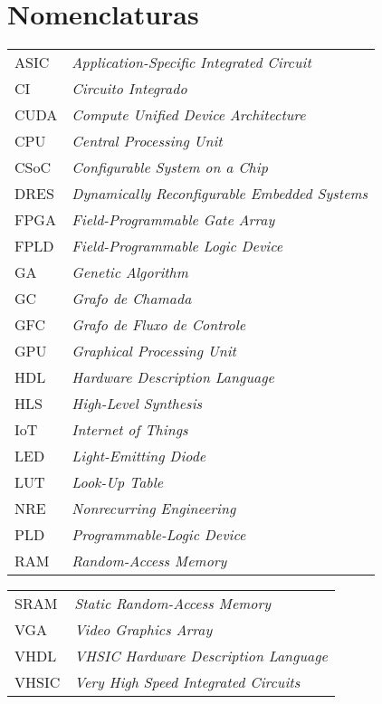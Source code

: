 
\chapter*{Nomenclaturas}

\begin{tabular*}{20cm}{lp{12cm}}
ASIC  & \textit{Application-Specific Integrated Circuit} \\
CI    & \textit{Circuito Integrado} \\
CUDA  & \textit{Compute Unified Device Architecture} \\
CPU   & \textit{Central Processing Unit} \\
CSoC  & \textit{Configurable System on a Chip} \\
DRES  & \textit{Dynamically Reconfigurable Embedded Systems} \\
FPGA  & \textit{Field-Programmable Gate Array} \\
FPLD  & \textit{Field-Programmable Logic Device} \\
GA    & \textit{Genetic Algorithm} \\
GC    & \textit{Grafo de Chamada} \\
GFC   & \textit{Grafo de Fluxo de Controle} \\
GPU   & \textit{Graphical Processing Unit} \\
HDL   & \textit{Hardware Description Language} \\
HLS   & \textit{High-Level Synthesis} \\ 
IoT   & \textit{Internet of Things} \\
LED   & \textit{Light-Emitting Diode} \\
LUT   & \textit{Look-Up Table} \\
NRE   & \textit{Nonrecurring Engineering} \\
PLD   & \textit{Programmable-Logic Device} \\
RAM   & \textit{Random-Access Memory} \\
\end{tabular*}

\begin{tabular*}{20cm}{lp{12cm}}
   SRAM  & \textit{Static Random-Access Memory} \\
   VGA   & \textit{Video Graphics Array} \\
   VHDL  & \textit{VHSIC Hardware Description Language} \\
   VHSIC & \textit{Very High Speed Integrated Circuits} \\
\end{tabular*}

